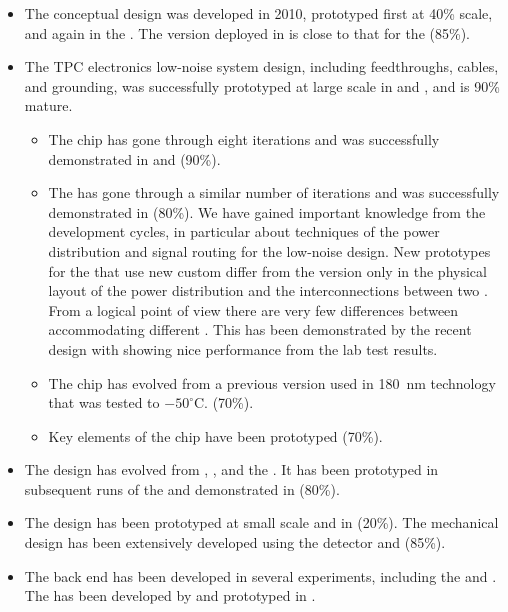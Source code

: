 \begin{itemize}
\item The  conceptual design was developed in 2010, prototyped
first at 40\% scale, and again in the . The version deployed in
 is close to that for the  (85\%). 

\item The TPC electronics 
 low-noise system design, including feedthroughs, cables, and
grounding, was successfully prototyped at large scale in
 and , and is 90\% mature. 
%
\begin{itemize}  
\item The  chip has gone through eight iterations and was successfully
demonstrated in  and  (90\%). 

\item The  has gone through a similar number of iterations and was
successfully demonstrated in  (80\%). We have gained important
knowledge from the 
development cycles, in particular about techniques of the power distribution and
signal routing for the low-noise design. New  prototypes for the  that use new custom  differ from the  version only in the physical layout of the power distribution and the interconnections between 
two . From a logical point of view there are very few differences between
 accommodating different . This has been demonstrated by the
recent  design with  showing nice performance from the lab
test results.

\item The  chip
has evolved from a previous version used in  180~nm
technology that was tested to $-50^\circ$C. (70\%). 

\item Key elements of
the  chip have been prototyped (70\%). 
\end{itemize}  %
%
\item The 
design has evolved from , , and the
.  It has been prototyped in subsequent runs of the
 and demonstrated in  (80\%). 

\item The 
 design has been prototyped at small scale and in
 (20\%). The mechanical design has been extensively
developed using the  detector and  (85\%). 

\item The
  back end has been developed in several
experiments, including the  and . The
   has been developed by
 and prototyped in .
\end{itemize}


